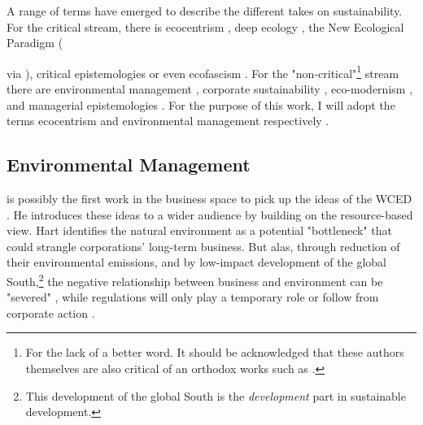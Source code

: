 \documentclass{article}
\begin{document}
	A range of terms have emerged to describe the different takes on sustainability. For the critical stream, there is ecocentrism \citep{Purser1995}, deep ecology \citep{Newton2002}, the New Ecological Paradigm ({\citealp{Catton1980} via \citealp{Hoffman2015}), critical epistemologies \citep{Ergene2020} or even ecofascism \citep{Newton2002}. For the "non-critical"\footnote{For the lack of a better word. It should be acknowledged that these authors themselves are also critical of an orthodox works such as \citet{Friedman1962}.} stream there are environmental management \citep{Purser1995}, corporate sustainability \citep{Hahn2014}, eco-modernism \citep{Springett2003}, and managerial epistemologies \citep{Ergene2020}. For the purpose of this work, I will adopt the terms ecocentrism and environmental management respectively \citep{Purser1995}.



	\subsection*{Environmental Management}

	\citet{Hart1995b} is possibly the first work in the business space to pick up the ideas of the WCED \citep{Montiel2014}. He introduces these ideas to a wider audience by building on the resource-based view. Hart identifies the natural environment as a potential "bottleneck" that could strangle corporations' long-term business. But alas, through reduction of their environmental emissions, and by low-impact development of the global South,\footnote{This development of the global South is the \textit{development} part in sustainable development.} the negative relationship between business and environment can be "severed" \citep[p. 996]{Hart1995b}, while regulations will only play a temporary role or follow from corporate action \citep[footnote p. 991, p. 995]{Hart1995b}.

}
\end{document}
